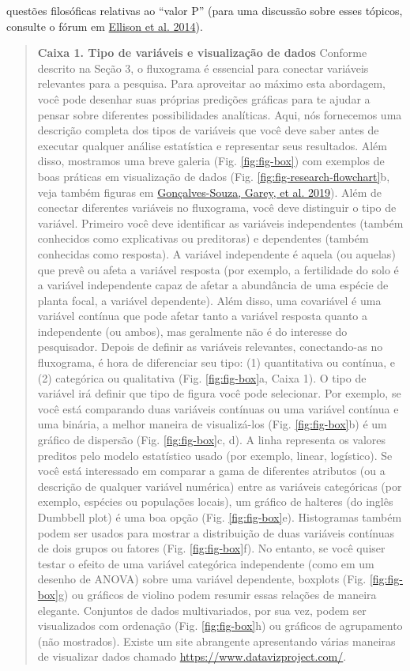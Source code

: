 \documentclass[
]{article}
\begin{document}
questões filosóficas relativas ao ``valor P'' (para uma discussão sobre esses tópicos, consulte o fórum em \protect\hyperlink{ref-ellison_p_2014}{Ellison et al. 2014}).

\begin{quote}
\textbf{Caixa 1. Tipo de variáveis e visualização de dados}
Conforme descrito na Seção 3, o fluxograma é essencial para conectar variáveis relevantes para a pesquisa. Para aproveitar ao máximo esta abordagem, você pode desenhar suas próprias predições gráficas para te ajudar a pensar sobre diferentes possibilidades analíticas. Aqui, nós fornecemos uma descrição completa dos tipos de variáveis que você deve saber antes de executar qualquer análise estatística e representar seus resultados. Além disso, mostramos uma breve galeria (Fig. \ref{fig:fig-box}) com exemplos de boas práticas em visualização de dados (Fig. \ref{fig:fig-research-flowchart}b, veja também figuras em \protect\hyperlink{ref-albuquerque_multidimensional_2019}{Gonçalves-Souza, Garey, et al. 2019}). Além de conectar diferentes variáveis no fluxograma, você deve distinguir o tipo de variável. Primeiro você deve identificar as variáveis independentes (também conhecidos como explicativas ou preditoras) e dependentes (também conhecidas como resposta). A variável independente é aquela (ou aquelas) que prevê ou afeta a variável resposta (por exemplo, a fertilidade do solo é a variável independente capaz de afetar a abundância de uma espécie de planta focal, a variável dependente). Além disso, uma covariável é uma variável contínua que pode afetar tanto a variável resposta quanto a independente (ou ambos), mas geralmente não é do interesse do pesquisador. Depois de definir as variáveis relevantes, conectando-as no fluxograma, é hora de diferenciar seu tipo: (1) quantitativa ou contínua, e (2) categórica ou qualitativa (Fig. \ref{fig:fig-box}a, Caixa 1). O tipo de variável irá definir que tipo de figura você pode selecionar. Por exemplo, se você está comparando duas variáveis contínuas ou uma variável contínua e uma binária, a melhor maneira de visualizá-los (Fig. \ref{fig:fig-box}b) é um gráfico de dispersão (Fig. \ref{fig:fig-box}c, d). A linha representa os valores preditos pelo modelo estatístico usado (por exemplo, linear, logístico). Se você está interessado em comparar a gama de diferentes atributos (ou a descrição de qualquer variável numérica) entre as variáveis categóricas (por exemplo, espécies ou populações locais), um gráfico de halteres (do inglês Dumbbell plot) é uma boa opção (Fig. \ref{fig:fig-box}e). Histogramas também podem ser usados para mostrar a distribuição de duas variáveis contínuas de dois grupos ou fatores (Fig. \ref{fig:fig-box}f). No entanto, se você quiser testar o efeito de uma variável categórica independente (como em um desenho de ANOVA) sobre uma variável dependente, boxplots (Fig. \ref{fig:fig-box}g) ou gráficos de violino podem resumir essas relações de maneira elegante. Conjuntos de dados multivariados, por sua vez, podem ser visualizados com ordenação (Fig. \ref{fig:fig-box}h) ou gráficos de agrupamento (não mostrados). Existe um site abrangente apresentando várias maneiras de visualizar dados chamado \url{https://www.datavizproject.com/}.
\end{quote}
\end{document}

